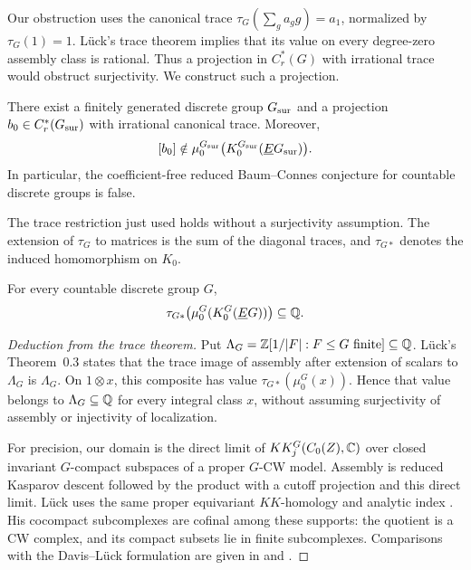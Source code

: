 Our obstruction uses the canonical trace
\(\tau_G(\sum_g a_g g)=a_1\), normalized by \(\tau_G(1)=1\).
L\"uck's trace theorem implies that its value on every degree-zero
assembly class is rational. Thus a projection in \(C_r^*(G)\) with
irrational trace would obstruct surjectivity. We construct such a
projection.

\begin{theorem}\label{thm:main}
There exist a finitely generated discrete group \(G_{\mathrm{sur}}\) and a projection
\(b_0\in C_r^*(G_{\mathrm{sur}})\) with irrational canonical trace. Moreover,
\[
[b_0]\notin\mu_0^{G_{\mathrm{sur}}}\bigl(K_0^{G_{\mathrm{sur}}}(\underline EG_{\mathrm{sur}})\bigr).
\]
In particular, the coefficient-free reduced Baum--Connes conjecture for
countable discrete groups is false.
\end{theorem}

The trace restriction just used holds without a surjectivity assumption.
The extension of \(\tau_G\) to matrices is the sum of the diagonal
traces, and \(\tau_{G*}\) denotes the induced homomorphism on \(K_0\).

\begin{theorem}[L\"uck]\label{thm:trace-image}
For every countable discrete group \(G\),
\[
\tau_{G*}\!\left(\mu_0^G(K_0^G(\underline EG))\right)\subseteq\mathbb Q.
\]
\end{theorem}

\begin{proof}[Deduction from the trace theorem]
Put
\(\Lambda_G=\mathbb Z[1/|F|:F\le G\text{ finite}]\subseteq\mathbb Q\).
L\"uck's Theorem~0.3 \cite{Luck2002} states that the trace image of assembly
after extension of scalars to \(\Lambda_G\) is \(\Lambda_G\).
On \(1\otimes x\), this composite has value
\(\tau_{G*}(\mu_0^G(x))\). Hence that value belongs to
\(\Lambda_G\subseteq\mathbb Q\) for every integral class \(x\), without
assuming surjectivity of assembly or injectivity of localization.

For precision, our domain is the direct limit of
\(KK_j^G(C_0(Z),\mathbb C)\) over closed invariant \(G\)-compact subspaces
of a proper \(G\)-CW model. Assembly is reduced Kasparov descent
followed by the product with a cutoff projection and this direct limit.
L\"uck uses the same proper equivariant \(KK\)-homology and analytic
index \cite[Sections~4 and~5]{Luck2002}. His cocompact subcomplexes
are cofinal among these supports: the quotient is a CW complex, and
its compact subsets lie in finite subcomplexes. Comparisons with the
Davis--L\"uck formulation are given in
\cite[Corollary~8.4]{HambletonPedersen2004} and
\cite[Theorem~5.3]{Kranz2021}.
\end{proof}


